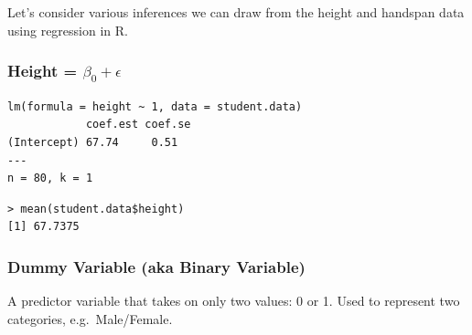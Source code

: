 \documentclass[handout]{beamer}
\begin{document}


\begin{frame}
\Large
Let's consider various inferences we can draw from the height and handspan data using regression in R.
\end{frame}




\begin{frame}[fragile]
\frametitle{Height = $\beta_0 +  \epsilon$}
\footnotesize
\begin{verbatim}
lm(formula = height ~ 1, data = student.data)
            coef.est coef.se
(Intercept) 67.74     0.51  
---
n = 80, k = 1
\end{verbatim}
\pause
\begin{verbatim}
> mean(student.data$height)
[1] 67.7375
\end{verbatim}
\end{frame}

\begin{frame}
\frametitle{Dummy Variable (aka Binary Variable)}
 
A predictor variable that takes on only two values: 0 or 1. Used to represent two categories, e.g.\ Male/Female.
\end{frame}


\end{document}
